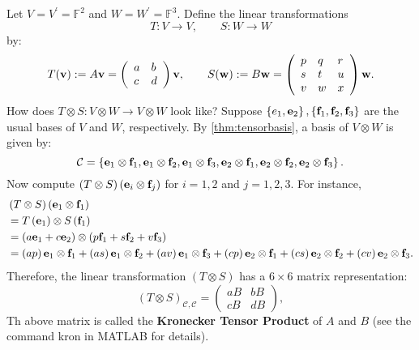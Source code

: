 \begin{example}\label{ex: notation-verification}
\item
Let \(V = {V}^{\prime } = {\mathbb{F}}^2\) and \(W = {W}^{\prime } = {\mathbb{F}}^{3}\). Define the linear transformations 
$$T :  V \rightarrow  V, \quad \quad S: W \rightarrow  W$$
by:
\[
T({\bf v}) := A{\bf v} = \left( \begin{array}{ll} a & b \\  c & d \end{array}\right){\bf v}, \quad \quad S({\bf w}) := B{\bf w} =\left( \begin{array}{lll} p & q & r \\  s & t & u \\  v & w & x \end{array}\right){\bf w}. 
\]
How does \(T \otimes  S : V \otimes  W \rightarrow  V \otimes  W\) look like? Suppose \(\left\{  {{e}_1,{\bf e}_2}\right\}  ,\left\{  {{\bf f}_1,{\bf f}_2,{\bf f}_{3}}\right\}\) are the usual bases of \(V\) and \(W\), respectively. By \autoref{thm:tensorbasis}, a basis of
\(V \otimes  W\) is given by:
\[
\mathcal{C} = \left\{  {{\bf e}_1 \otimes  {\bf f}_1,{\bf e}_1 \otimes  {\bf f}_2,{\bf e}_1 \otimes  {\bf f}_{3},{\bf e}_2 \otimes  {\bf f}_1,{\bf e}_2 \otimes  {\bf f}_2,{\bf e}_2 \otimes  {\bf f}_{3}}\right\}  .
\]
Now compute \(\left( {T \otimes  S}\right) \left( {{\bf e}_{i} \otimes  {\bf f}_{j}}\right)\) for \(i = 1,2\) and \(j = 1,2,3\). For instance,
\begin{align*}
&\left( {T \otimes  S}\right) \left( {{\bf e}_1 \otimes  {\bf f}_1}\right)\\ 
&= T\left( {\bf e}_1\right)  \otimes  S\left( {\bf f}_1\right)\\
&= \left( {a{\bf e}_1 + c{\bf e}_2}\right)  \otimes  \left( {p{\bf f}_1 + s{\bf f}_2 + v{\bf f}_{3}}\right)
\\
&= \left( {ap}\right) {\bf e}_1 \otimes  {\bf f}_1 + \left( {as}\right) {\bf e}_1 \otimes  {\bf f}_2 + \left( {av}\right) {\bf e}_1 \otimes  {\bf f}_{3} + \left( {cp}\right) {\bf e}_2 \otimes  {\bf f}_1 + \left( {cs}\right) {\bf e}_2 \otimes  {\bf f}_2 + \left( {cv}\right) {\bf e}_2 \otimes  {\bf f}_{3}.
\end{align*}
Therefore, the linear transformation \(\left( {T \otimes  S}\right)\) has a $6 \times 6$ matrix representation:
\[
{\left( T \otimes  S\right) }_{\mathcal{C},\mathcal{C}} = \left( \begin{array}{ll} {aB} & {bB} \\  {cB} & {dB} \end{array}\right) ,
\]
Th above matrix is called the {\bf Kronecker Tensor Product} of $A$ and $B$ (see the command kron in MATLAB for details).
\end{example}

